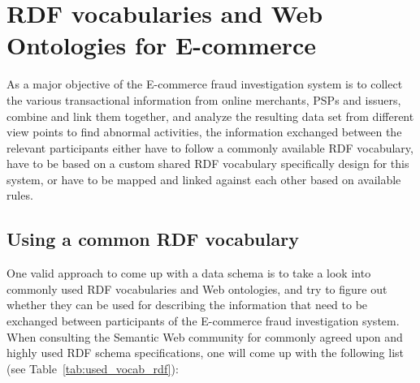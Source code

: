 
\section{\gls{RDF} vocabularies and Web Ontologies for \gls{E-commerce}}
\label{sec:choose_data_schema}

As a major objective of the \gls{E-commerce} fraud investigation system is to collect the various transactional information from online merchants, \gls{PSP}s and issuers, combine and link them together, and analyze the resulting data set from different view points to find abnormal activities, the information exchanged between the relevant participants either have to follow a commonly available \gls{RDF} vocabulary, have to be based on a custom shared \gls{RDF} vocabulary specifically design for this system, or have to be mapped and linked against each other based on available rules.

\subsection{Using a common \gls{RDF} vocabulary}
\label{subsec:reuse_vocab_web}

One valid approach to come up with a data schema is to take a look into commonly used \gls{RDF} vocabularies and Web ontologies, and try to figure out whether they can be used for describing the information that need to be exchanged between participants of the \gls{E-commerce} fraud investigation system. When consulting the Semantic Web community for commonly agreed upon and highly used \gls{RDF} schema specifications, one will come up with the following list (see Table~\ref{tab:used_vocab_rdf}):\@

